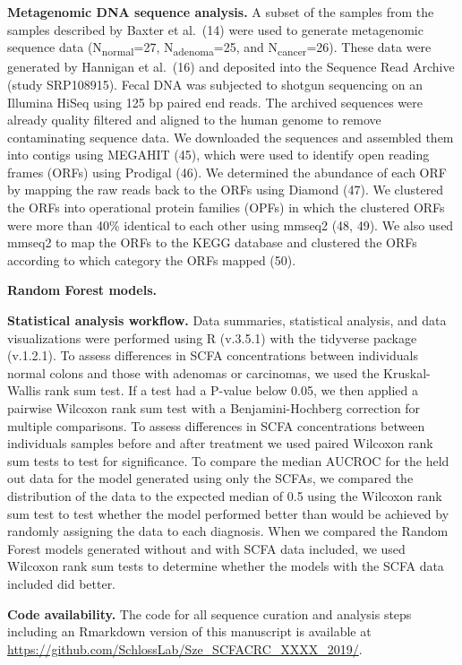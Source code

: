 \documentclass[11pt,]{article}
\begin{document}
\textbf{Metagenomic DNA sequence analysis.} A subset of the samples from
the samples described by Baxter et al.~(14) were used to generate
metagenomic sequence data (N\textsubscript{normal}=27,
N\textsubscript{adenoma}=25, and N\textsubscript{cancer}=26). These data
were generated by Hannigan et al.~(16) and deposited into the Sequence
Read Archive (study SRP108915). Fecal DNA was subjected to shotgun
sequencing on an Illumina HiSeq using 125 bp paired end reads. The
archived sequences were already quality filtered and aligned to the
human genome to remove contaminating sequence data. We downloaded the
sequences and assembled them into contigs using MEGAHIT (45), which were
used to identify open reading frames (ORFs) using Prodigal (46). We
determined the abundance of each ORF by mapping the raw reads back to
the ORFs using Diamond (47). We clustered the ORFs into operational
protein families (OPFs) in which the clustered ORFs were more than 40\%
identical to each other using mmseq2 (48, 49). We also used mmseq2 to
map the ORFs to the KEGG database and clustered the ORFs according to
which category the ORFs mapped (50).

\textbf{Random Forest models.}

\textbf{Statistical analysis workflow.} Data summaries, statistical
analysis, and data visualizations were performed using R (v.3.5.1) with
the tidyverse package (v.1.2.1). To assess differences in SCFA
concentrations between individuals normal colons and those with adenomas
or carcinomas, we used the Kruskal-Wallis rank sum test. If a test had a
P-value below 0.05, we then applied a pairwise Wilcoxon rank sum test
with a Benjamini-Hochberg correction for multiple comparisons. To assess
differences in SCFA concentrations between individuals samples before
and after treatment we used paired Wilcoxon rank sum tests to test for
significance. To compare the median AUCROC for the held out data for the
model generated using only the SCFAs, we compared the distribution of
the data to the expected median of 0.5 using the Wilcoxon rank sum test
to test whether the model performed better than would be achieved by
randomly assigning the data to each diagnosis. When we compared the
Random Forest models generated without and with SCFA data included, we
used Wilcoxon rank sum tests to determine whether the models with the
SCFA data included did better.

\textbf{Code availability.} The code for all sequence curation and
analysis steps including an Rmarkdown version of this manuscript is
available at \url{https://github.com/SchlossLab/Sze_SCFACRC_XXXX_2019/}.
\end{document}
